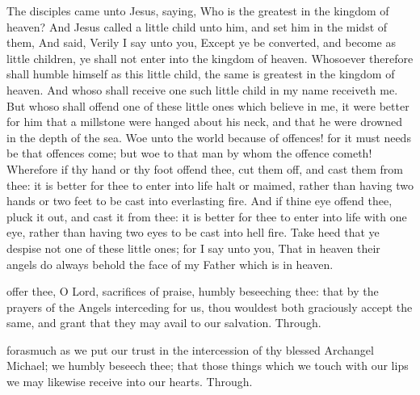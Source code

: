  The disciples came unto Jesus, saying, Who is the greatest in the kingdom of heaven? And Jesus called a little child unto him, and set him in the midst of them, And said, Verily I say unto you, Except ye be converted, and become as little children, ye shall not enter into the kingdom of heaven. Whosoever therefore shall humble himself as this little child, the same is greatest in the kingdom of heaven. And whoso shall receive one such little child in my name receiveth me. But whoso shall offend one of these little ones which believe in me, it were better for him that a millstone were hanged about his neck, and that he were drowned in the depth of the sea. Woe unto the world because of offences! for it must needs be that offences come; but woe to that man by whom the offence cometh! Wherefore if thy hand or thy foot offend thee, cut them off, and cast them from thee: it is better for thee to enter into life halt or maimed, rather than having two hands or two feet to be cast into everlasting fire. And if thine eye offend thee, pluck it out, and cast it from thee: it is better for thee to enter into life with one eye, rather than having two eyes to be cast into hell fire. Take heed that ye despise not one of these little ones; for I say unto you, That in heaven their angels do always behold the face of my Father which is in heaven.


\secret
{} offer thee, O Lord, sacrifices of praise, humbly beseeching thee: that by the prayers of the Angels interceding for us, thou wouldest both graciously accept the same, and grant that they may avail to our salvation. Through.


\postcommunion
{} forasmuch as we put our trust in the intercession of thy blessed Archangel Michael; we humbly beseech thee; that those things which we touch with our lips we may likewise receive into our hearts. Through.


